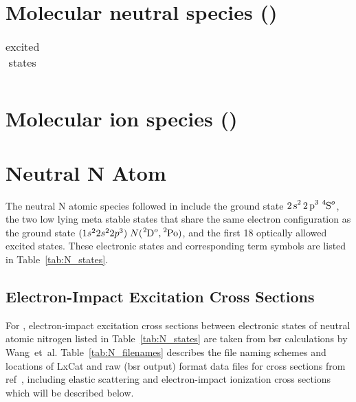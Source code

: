 \section{Molecular neutral species ()}

\begin{table}
		\caption{ excited states}
		\begin{tabular}{c c c c c c c c}
				\hline\hline
				
				\hline\hline
		\end{tabular}
\end{table}




\section{Molecular ion species ()}
\tbd


\section{Neutral N Atom}

The neutral N atomic species followed in \bpcmn{} include
the ground state $\ce{2s^2 2p^3}\;\ce{^4S^o}$, the two low lying meta stable states
that share the same electron configuration as the ground state
$(1s^22s^22p^3)\; N(\ce{^2D^o}, \ce{^2Po})$, and the first 18 optically allowed 
excited states.  These electronic states and corresponding term symbols
are listed in Table~\ref{tab:N_states}. 

\subsection{Electron-Impact Excitation Cross Sections}

For \bpcmn{}, electron-impact excitation
cross sections between electronic 
states of neutral
atomic nitrogen listed in Table~\ref{tab:N_states} are taken from \ac{bsr}
calculations by Wang~et~al.\cite{wang2014} 
Table~\ref{tab:N_filenames} describes the file naming schemes and locations of LxCat and raw (\ac{bsr} output)
format data files for cross sections from ref~\cite{wang2014}, including elastic scattering and electron-impact 
ionization cross sections which will be described below. \\

